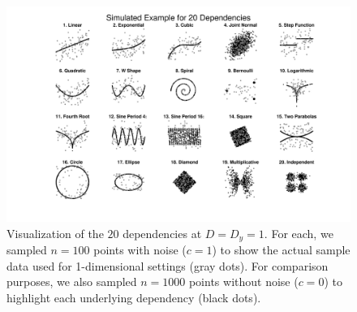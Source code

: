 \documentclass[11pt]{article}
\newcommand{\note}[2][]{\added[#1,remark={#2}]{}}
\providecommand{\sct}[1]{{\normalfont\textsc{#1}}}
\providecommand{\mb}[1]{\boldsymbol{#1}}
\newcommand{\Mgc}{\sct{Mgc}}
\newcommand{\Hhg}{\sct{Hhg}}
\newcommand{\Mcorr}{\sct{Mcorr}}
\newcommand{\jv}[1]{{\note{jv: #1}}}
\begin{document}


\begin{figure}[htbp]
\includegraphics[trim={5cm 1.5cm 4cm 0.5cm},clip, width=1.0\textwidth]{Figures/FigSimVisual}
\caption{Visualization of the $20$ dependencies at $D=D_{y}=1$. For each, we sampled $n=100$ points with noise ($c=1$) to show the actual sample data used for 1-dimensional settings (gray dots). For comparison purposes, we also sampled $n=1000$ points without noise ($c=0$) to highlight each underlying dependency (black dots).
}
\label{f:dependencies}
\end{figure}
\end{document}
